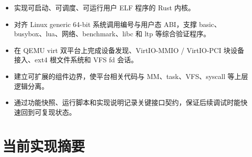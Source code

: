 \documentclass[12pt,openany,oneside,AutoFakeBold=true]{ctexbook}
\begin{document}
\begin{itemize}
  \item 实现可启动、可调度、可运行用户 ELF 程序的 Rust 内核。
  \item 对齐 Linux generic 64-bit 系统调用编号与用户态 ABI，支撑 basic、busybox、lua、网络、benchmark、libc 和 ltp 等综合验证程序。
  \item 在 QEMU virt 双平台上完成设备发现、VirtIO-MMIO / VirtIO-PCI 块设备接入、ext4 根文件系统和 VFS fd 会话。
  \item 建立可扩展的组件边界，使平台相关代码与 MM、task、VFS、syscall 等上层逻辑分离。
  \item 通过功能快照、运行脚本和实现说明记录关键接口契约，保证后续调试时能快速回到可复现状态。
\end{itemize}


\section{当前实现摘要}
\end{document}
